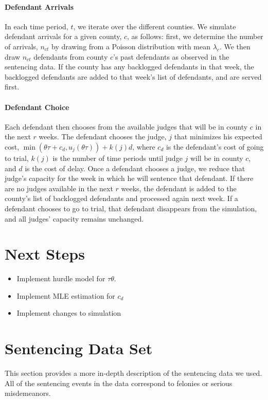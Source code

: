 \documentclass[11pt, oneside]{article}   	%
\theoremstyle{ModifiedStyle}
\begin{document}
  \paragraph{Defendant Arrivals} In each time period, $t$, we iterate over the different counties. We simulate defendant arrivals for a given county, $c$, as follows: first, we determine the number of arrivals, $n_{ct}$ by drawing from a Poisson distribution with mean $\lambda_c$. We then draw $n_{ct}$ defendants from county $c$'s past defendants as observed in the sentencing data. If the county has any backlogged defendants in that week, the backlogged defendants are added to that week's list of defendants, and are served first.

  \paragraph{Defendant Choice} Each defendant then chooses from the available judges that will be in
  county $c$ in the next $r$ weeks. The defendant chooses the judge, $j$ that minimizes his expected cost, $\min(\theta \tau + c_d,u_j(\theta \tau)) + k(j)d$, where $c_d$ is the defendant's cost of going to trial, $k(j)$ is the number of time periods until judge $j$ will be in county $c$, and $d$ is the cost of delay. Once a defendant chooses a judge, we reduce that judge's capacity for the week in which he will sentence that defendant. If there are no judges available in the next $r$ weeks, the defendant is added to the county's list of backlogged defendants and processed again next week. If a defendant chooses to go to trial, that defendant disappears from the simulation, and all judges' capacity remains unchanged.

\section{Next Steps}
  \begin{itemize}
    \item Implement hurdle model for $\tau \theta$.
    \item Implement MLE estimation for $c_d$
    \item Implement changes to simulation
  \end{itemize}

 \printbibliography

\appendix
{}
\section{Sentencing Data Set}
  \label{Appendix:Sentencing_Data}
  This section provides a more in-depth description of the sentencing data we used. All of the sentencing events in the data correspond to felonies or serious misdemeanors.
\end{document}

